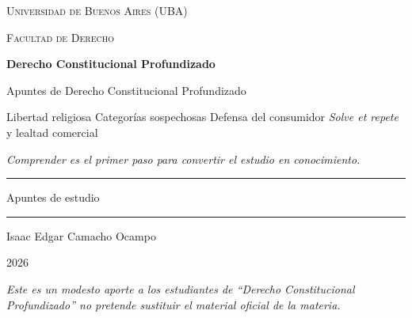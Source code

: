 \documentclass[12pt,oneside]{book}
\newcommand{\universidad}{Universidad de Buenos Aires (UBA)}
\newcommand{\facultad}{Facultad de Derecho}
\newcommand{\materia}{Derecho Constitucional Profundizado}
\newcommand{\titulo}{Apuntes de Derecho Constitucional Profundizado}
\newcommand{\subtitulo}{Libertad religiosa \textperiodcentered{} Categorías sospechosas \textperiodcentered{} Defensa del consumidor \textperiodcentered{} \textit{Solve et repete} y lealtad comercial}
\newcommand{\autor}{Isaac Edgar Camacho Ocampo}
\newcommand{\anio}{2026}
\begin{document}
\begin{titlepage}

\thispagestyle{empty}

\begin{center}

\vspace*{1cm}

{\large \textsc{\universidad}}

\vspace{0.2cm}

{\large \textsc{\facultad}}

\vspace{3cm}

{\Huge \textbf{\materia}}

\vspace{1cm}

{\LARGE \titulo}

\vspace{0.4cm}

{\normalsize \subtitulo}

\vspace{0.8cm}

\textit{Comprender es el primer paso para convertir el estudio en conocimiento.}

\vspace{1.2cm}

\rule{0.70\textwidth}{0.5pt}

\vspace{0.5cm}

{\large Apuntes de estudio}

\vspace{0.5cm}

\rule{0.70\textwidth}{0.5pt}

\vfill

{\large \autor}

\vspace{0.3cm}

{\large \anio}

\end{center}

\vfill

\begin{flushleft}
\textit{Este es un modesto aporte a los estudiantes de ``Derecho Constitucional Profundizado'' no pretende sustituir el material oficial de la materia.}
\end{flushleft}

\end{titlepage}
\end{document}

